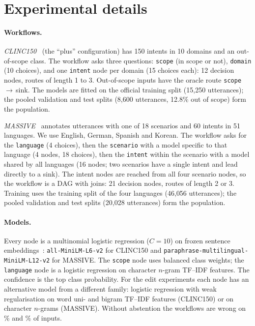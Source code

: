 \section{Experimental details}\label{app:details}

\paragraph{Workflows.}
\emph{CLINC150}~\citep{larson2019clinc} (the ``plus'' configuration) has 150 intents in 10
domains and an out-of-scope class. The workflow asks three questions: \texttt{scope}
(in scope or not), \texttt{domain} (10 choices), and one \texttt{intent} node per domain (15
choices each): 12 decision nodes, routes of length 1 to 3. Out-of-scope inputs have the oracle
route \texttt{scope}\,$\to$\,sink. The models are fitted on the official training split
(15{,}250 utterances); the pooled validation and test splits (8{,}600 utterances, 12.8\%
out of scope) form the population.

\emph{MASSIVE}~\citep{fitzgerald2022massive} annotates utterances with one of 18 scenarios and
60 intents in 51 languages. We use English, German, Spanish and Korean. The workflow asks for
the \texttt{language} (4 choices), then the \texttt{scenario} with a model specific to that
language (4 nodes, 18 choices), then the \texttt{intent} within the scenario with a model
shared by all languages (16 nodes; two scenarios have a single intent and lead directly to a
sink). The intent nodes are reached from all four scenario nodes, so the workflow is a DAG
with joins: 21 decision nodes, routes of length 2 or 3. Training uses the training split of
the four languages (46{,}056 utterances); the pooled validation and test splits (20{,}028
utterances) form the population.

\paragraph{Models.} Every node is a multinomial logistic regression ($C=10$) on frozen
sentence embeddings~\citep{reimers2019sbert}: \texttt{all-MiniLM-L6-v2} for CLINC150 and
\texttt{paraphrase-multilingual-MiniLM-L12-v2} for MASSIVE. The \texttt{scope} node uses
balanced class weights; the \texttt{language} node is a logistic regression on character
$n$-gram TF--IDF features. The confidence is the top class probability. For the edit
experiments each node has an alternative model from a different family: logistic regression
with weak regularisation on word uni- and bigram TF--IDF features (CLINC150) or on character
$n$-grams (MASSIVE). Without abstention the workflows are wrong on \FreeErrClinc\% and
\FreeErrMassive\% of inputs.

